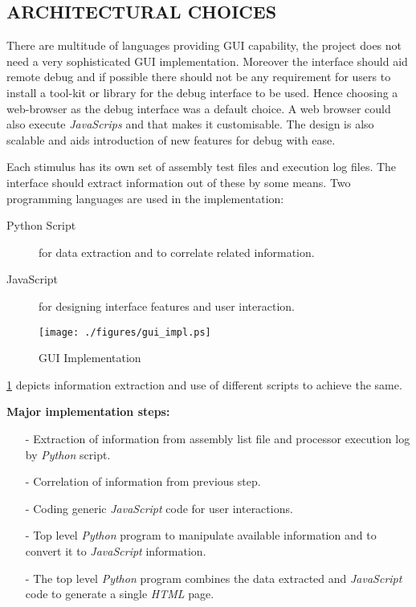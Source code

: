 \subsection {ARCHITECTURAL CHOICES}
There are multitude of languages providing GUI capability, the project does not need a very sophisticated GUI implementation. Moreover the interface should aid remote debug and if possible there should not be any requirement for users to install a tool-kit or library for the debug interface to be used. Hence choosing a web-browser as the debug interface was a default choice. A web browser could also execute {\it JavaScrips} and that makes it customisable. The design is also scalable and aids introduction of new features for debug with ease.

Each stimulus has its own set of assembly test files and execution log files. The interface should extract information out of these by some means. Two programming languages are used in the implementation:
\begin{description}
\item[Python Script] for data extraction and to correlate related information.
\item[JavaScript] for designing interface features and user interaction.
\end{description}

\begin{figure}[h]
\centering
\texttt{[image: ./figures/gui\_impl.ps]}
\caption{GUI Implementation} 
\label{fig:gui_impl.eps}
\end{figure}

\figurename{\ref{fig:gui_impl.eps}} depicts information extraction and use of different scripts to achieve the same. 

{\bf Major implementation steps:}
\begin{itemize}
\item[-] Extraction of information from assembly list file and processor execution log by {\it Python} script.
\item[-] Correlation of information from previous step.
\item[-] Coding generic {\it JavaScript} code for user interactions.
\item[-] Top level {\it Python} program to manipulate available information and to convert it to {\it JavaScript} information. 
\item[-] The top level {\it Python} program combines the data extracted and {\it JavaScript}  code to generate a single {\it HTML} page. 
\end{itemize}

